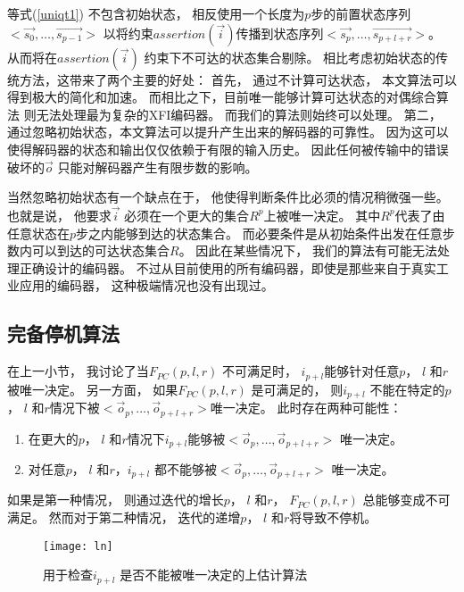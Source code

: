 等式(\ref{uniqt1}) 不包含初始状态，
相反使用一个长度为$p$步的前置状态序列$<\vec{s_0},\dots,\vec{s_{p-1}}>$
以将约束$assertion(\vec{i})$传播到状态序列$<\vec{s_p},\dots,\vec{s_{p+l+r}}>$。
从而将在$assertion(\vec{i})$ 约束下不可达的状态集合剔除。
相比考虑初始状态的传统方法，这带来了两个主要的好处：
首先，
通过不计算可达状态，
本文算法可以得到极大的简化和加速。
而相比之下，目前唯一能够计算可达状态的对偶综合算法
则无法处理最为复杂的XFI编码器。
而我们的算法则始终可以处理。
第二，
通过忽略初始状态，本文算法可以提升产生出来的解码器的可靠性。
因为这可以使得解码器的状态和输出仅仅依赖于有限的输入历史。
因此任何被传输中的错误破坏的$\vec{o}$ 只能对解码器产生有限步数的影响。

当然忽略初始状态有一个缺点在于，
他使得判断条件比必须的情况稍微强一些。
也就是说，
他要求$\vec{i}$ 必须在一个更大的集合$R^p$上被唯一决定。
其中$R^p$代表了由任意状态在$p$步之内能够到达的状态集合。
而必要条件是从初始条件出发在任意步数内可以到达的可达状态集合$R$。
因此在某些情况下，
我们的算法有可能无法处理正确设计的编码器。
不过从目前使用的所有编码器，即使是那些来自于真实工业应用的编码器，
这种极端情况也没有出现过。


\subsection{完备停机算法}\label{subsec_complete}


在上一小节，
我讨论了当$F_{PC}(p,l,r)$ 不可满足时，
$i_{p+l}$能够针对任意$p$， $l$ 和$r$被唯一决定。
另一方面，
如果$F_{PC}(p,l,r)$ 是可满足的，
则$i_{p+l}$ 不能在特定的$p$， $l$ 和$r$情况下被$<\vec{o}_{p},\dots,\vec{o}_{p+l+r}>$唯一决定。
此时存在两种可能性：
\begin{enumerate}
 \item
在更大的$p$， $l$ 和$r$情况下$i_{p+l}$能够被$<\vec{o}_{p},\dots,\vec{o}_{p+l+r}>$ 唯一决定。
 \item
对任意$p$， $l$ 和$r$，$i_{p+l}$ 都不能够被$<\vec{o}_{p},\dots,\vec{o}_{p+l+r}>$ 唯一决定。
\end{enumerate}

如果是第一种情况，
则通过迭代的增长$p$， $l$ 和$r$，
$F_{PC}(p,l,r)$ 总能够变成不可满足。
然而对于第二种情况，
迭代的递增$p$， $l$ 和$r$将导致不停机。

\begin{figure}[t]
\begin{center}
\texttt{[image: ln]}
\end{center}
\caption{用于检查$i_{p+l}$ 是否不能被唯一决定的上估计算法}
  \label{fig_ln_double}
\end{figure}

